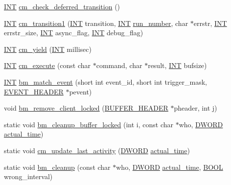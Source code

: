 \begin{DoxyCompactItemize}
\item 
\hyperlink{vppg_8h_a392e62da233ed3e2f7c3fd4f487a3896}{INT} \hyperlink{group__cmfunctionc_gabc9cc8ea21e435ffff94d359686897e3}{cm\_\-check\_\-deferred\_\-transition} ()
\item 
\hyperlink{vppg_8h_a392e62da233ed3e2f7c3fd4f487a3896}{INT} \hyperlink{group__cmfunctionc_ga0dd9a488ef81843f8a64c7930ad40f06}{cm\_\-transition1} (\hyperlink{vppg_8h_a392e62da233ed3e2f7c3fd4f487a3896}{INT} transition, \hyperlink{vppg_8h_a392e62da233ed3e2f7c3fd4f487a3896}{INT} \hyperlink{mevb_8c_a16695ea2bfd19f294afe066d6007ab36}{run\_\-number}, char $\ast$errstr, \hyperlink{vppg_8h_a392e62da233ed3e2f7c3fd4f487a3896}{INT} errstr\_\-size, \hyperlink{vppg_8h_a392e62da233ed3e2f7c3fd4f487a3896}{INT} async\_\-flag, \hyperlink{vppg_8h_a392e62da233ed3e2f7c3fd4f487a3896}{INT} debug\_\-flag)
\item 
\hyperlink{vppg_8h_a392e62da233ed3e2f7c3fd4f487a3896}{INT} \hyperlink{group__cmfunctionc_ga115565c5a1d9591fcabf844c1dd624f8}{cm\_\-yield} (\hyperlink{vppg_8h_a392e62da233ed3e2f7c3fd4f487a3896}{INT} millisec)
\item 
\hyperlink{vppg_8h_a392e62da233ed3e2f7c3fd4f487a3896}{INT} \hyperlink{group__cmfunctionc_ga609631cf55247d2e58069bae08419a86}{cm\_\-execute} (const char $\ast$command, char $\ast$result, \hyperlink{vppg_8h_a392e62da233ed3e2f7c3fd4f487a3896}{INT} bufsize)
\item 
\hyperlink{vppg_8h_a392e62da233ed3e2f7c3fd4f487a3896}{INT} \hyperlink{group__bmfunctionc_ga181dcf462745127aa3d011a2e3fee805}{bm\_\-match\_\-event} (short int event\_\-id, short int trigger\_\-mask, \hyperlink{structEVENT__HEADER}{EVENT\_\-HEADER} $\ast$pevent)
\item 
void \hyperlink{group__bmfunctionc_gaf13b277e24b666918ee8aec0160f5288}{bm\_\-remove\_\-client\_\-locked} (\hyperlink{structBUFFER__HEADER}{BUFFER\_\-HEADER} $\ast$pheader, int j)
\item 
static void \hyperlink{group__bmfunctionc_ga6a2a39a8d4d4a0302ec443762e7a34b4}{bm\_\-cleanup\_\-buffer\_\-locked} (int i, const char $\ast$who, \hyperlink{vt2_8h_a798af1e30bc65f319c1a246cecf59e39}{DWORD} \hyperlink{mevb_8c_a6431147bd66aebfe3ca728d244da1253}{actual\_\-time})
\item 
static void \hyperlink{group__bmfunctionc_ga2109ffa213706ade60f0b054d6c39164}{cm\_\-update\_\-last\_\-activity} (\hyperlink{vt2_8h_a798af1e30bc65f319c1a246cecf59e39}{DWORD} \hyperlink{mevb_8c_a6431147bd66aebfe3ca728d244da1253}{actual\_\-time})
\item 
static void \hyperlink{group__bmfunctionc_ga7ea560e34b23fa5fbf9596c2cc9d156d}{bm\_\-cleanup} (const char $\ast$who, \hyperlink{vt2_8h_a798af1e30bc65f319c1a246cecf59e39}{DWORD} \hyperlink{mevb_8c_a6431147bd66aebfe3ca728d244da1253}{actual\_\-time}, \hyperlink{vt2_8h_a239c7f0d40651c3e419c5b9651507d14}{BOOL} wrong\_\-interval)

\end{DoxyCompactItemize}
